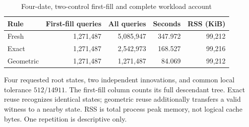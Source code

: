 \begin{table}[htbp]
\centering
\caption{Four-date, two-control first-fill and complete workload account}\label{tab:horizon72}
{\small\setlength{\tabcolsep}{4pt}
\begin{tabular}{lrrrr}
\hline
Rule & First-fill queries & All queries & Seconds & RSS (KiB) \\
\hline
Fresh & 1,271,487 & 5,085,947 & 347.972 & 99,212 \\
Exact & 1,271,487 & 2,542,973 & 168.527 & 99,216 \\
Geometric & 1,271,487 & 1,271,487 & 84.069 & 99,212 \\
\hline
\end{tabular}}
\par\smallskip
{\footnotesize Four requested root states, two independent innovations, and common local tolerance $512/14911$. The first-fill column counts its full descendant tree. Exact reuse recognizes identical states; geometric reuse additionally transfers a valid witness to a nearby state. RSS is total process peak memory, not logical cache bytes. One repetition is descriptive only.}
\end{table}
